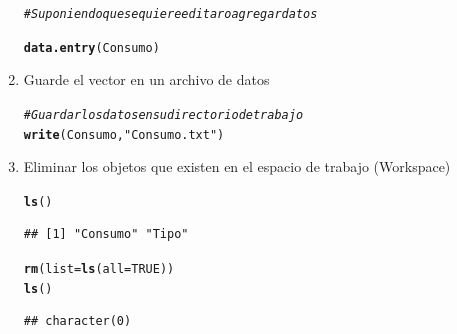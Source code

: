 \documentclass[12pt,letterpaper]{article}\usepackage[]{graphicx}\usepackage[]{color}
\makeatletter
\newcommand{\hlnum}[1]{\textcolor[rgb]{0.686,0.059,0.569}{#1}}%
\newcommand{\hlstr}[1]{\textcolor[rgb]{0.192,0.494,0.8}{#1}}%
\newcommand{\hlcom}[1]{\textcolor[rgb]{0.678,0.584,0.686}{\textit{#1}}}%
\newcommand{\hlstd}[1]{\textcolor[rgb]{0.345,0.345,0.345}{#1}}%
\newcommand{\hlkwc}[1]{\textcolor[rgb]{0.333,0.667,0.333}{#1}}%
\newcommand{\hlkwd}[1]{\textcolor[rgb]{0.737,0.353,0.396}{\textbf{#1}}}%
\newenvironment{kframe}{%
 \def\at@end@of@kframe{}%
 \ifinner\ifhmode%
  \def\at@end@of@kframe{\end{minipage}}%
  \begin{minipage}{\columnwidth}%
 \fi\fi%
 \def\FrameCommand##1{\hskip\@totalleftmargin \hskip-\fboxsep
 \colorbox{shadecolor}{##1}\hskip-\fboxsep
     \hskip-\linewidth \hskip-\@totalleftmargin \hskip\columnwidth}%
 \MakeFramed {\advance\hsize-\width
   \@totalleftmargin\z@ \linewidth\hsize
   \@setminipage}}%
 {\par\unskip\endMakeFramed%
 \at@end@of@kframe}
\newenvironment{knitrout}{}{} %
\makeatother
\begin{document}
\begin{enumerate}
\begin{knitrout}
\begin{kframe}
\begin{alltt}
\hlcom{# Suponiendo que se quiere editar o agregar datos }
\end{alltt}
\end{kframe}
\end{knitrout}
\begin{knitrout}
\color{fgcolor}\begin{kframe}
\begin{alltt}
\hlkwd{data.entry}\hlstd{(Consumo)}
\end{alltt}
\end{kframe}
\end{knitrout}

\item Guarde el vector en un archivo de datos
\begin{knitrout}
\color{fgcolor}\begin{kframe}
\begin{alltt}
\hlcom{# Guardar los datos en su directorio de trabajo }
\hlkwd{write}\hlstd{(Consumo,} \hlstr{"Consumo.txt"}\hlstd{)}
\end{alltt}
\end{kframe}
\end{knitrout}

\item Eliminar los objetos que existen en el espacio de trabajo (Workspace)
\begin{knitrout}
\color{fgcolor}\begin{kframe}
\begin{alltt}
\hlkwd{ls}\hlstd{()}
\end{alltt}
\begin{verbatim}
## [1] "Consumo" "Tipo"
\end{verbatim}
\begin{alltt}
\hlkwd{rm}\hlstd{(}\hlkwc{list}\hlstd{=}\hlkwd{ls}\hlstd{(}\hlkwc{all}\hlstd{=}\hlnum{TRUE}\hlstd{))}
\hlkwd{ls}\hlstd{()}
\end{alltt}
\begin{verbatim}
## character(0)
\end{verbatim}
\end{kframe}
\end{knitrout}


\end{enumerate}
\end{document}
